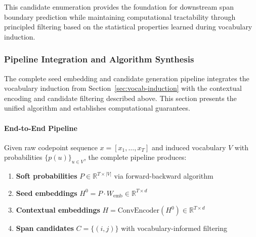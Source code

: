 This candidate enumeration provides the foundation for downstream span boundary prediction while maintaining computational tractability through principled filtering based on the statistical properties learned during vocabulary induction.

\subsubsection{Pipeline Integration and Algorithm Synthesis}
\label{sec:pipeline-integration}

The complete seed embedding and candidate generation pipeline integrates the vocabulary induction from Section~\ref{sec:vocab-induction} with the contextual encoding and candidate filtering described above. This section presents the unified algorithm and establishes computational guarantees.

\paragraph{End-to-End Pipeline}

Given raw codepoint sequence \(x = [x_1, \ldots, x_T]\) and induced vocabulary \(V\) with probabilities \(\{p(u)\}_{u \in V}\), the complete pipeline produces:

\begin{enumerate}
	\item \textbf{Soft probabilities} \(P \in \mathbb{R}^{T \times |V|}\) via forward-backward algorithm
	\item \textbf{Seed embeddings} \(H^0 = P \cdot W_{\mathrm{emb}} \in \mathbb{R}^{T \times d}\)  
	\item \textbf{Contextual embeddings} \(H = \text{ConvEncoder}(H^0) \in \mathbb{R}^{T \times d}\)
	\item \textbf{Span candidates} \(C = \{(i,j)\}\) with vocabulary-informed filtering
\end{enumerate}

